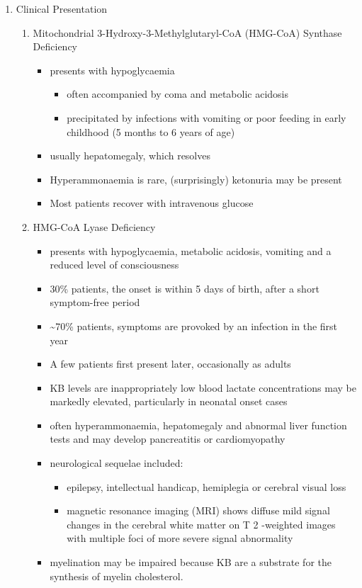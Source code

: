 \documentclass{scrartcl}
\begin{document}
\begin{enumerate}
\item Clinical Presentation
\label{sec:orgfb7572c}
\begin{enumerate}
\item Mitochondrial 3-Hydroxy-3-Methylglutaryl-CoA (HMG-CoA) Synthase Deficiency
\label{sec:org25e57b6}
\begin{itemize}
\item presents with hypoglycaemia
\begin{itemize}
\item often accompanied by coma and metabolic acidosis
\item precipitated by infections with vomiting or poor feeding in early
childhood (5 months to 6 years of age)
\end{itemize}
\item usually hepatomegaly, which resolves
\item Hyperammonaemia is rare, (surprisingly) ketonuria may be present
\item Most patients recover with intravenous glucose
\end{itemize}

\item HMG-CoA Lyase Deficiency
\label{sec:org5849df6}
\begin{itemize}
\item presents with hypoglycaemia, metabolic acidosis, vomiting and a
reduced level of consciousness
\item 30\% patients, the onset is within 5 days of birth, after a short symptom-free period
\item \textasciitilde{}70\% patients, symptoms are provoked by an infection in the first year
\item A few patients first present later, occasionally as adults
\item KB levels are inappropriately low blood lactate concentrations
may be markedly elevated, particularly in neonatal onset cases
\item often hyperammonaemia, hepatomegaly and abnormal liver function tests and
may develop pancreatitis or cardiomyopathy
\item neurological sequelae included:
\begin{itemize}
\item epilepsy, intellectual handicap, hemiplegia or cerebral visual loss
\item magnetic resonance imaging (MRI) shows diffuse mild signal changes
in the cerebral white matter on T 2 -weighted images with multiple
foci of more severe signal abnormality
\end{itemize}
\item myelination may be impaired because KB are a substrate for the
synthesis of myelin cholesterol.
\end{itemize}
\end{enumerate}


\end{enumerate}
\end{document}
